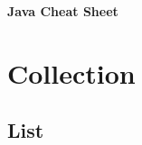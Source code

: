\begin{center}
     \Large{\textbf{Java Cheat Sheet}} \\
\end{center}

\section{Collection}
\subsection{List}









